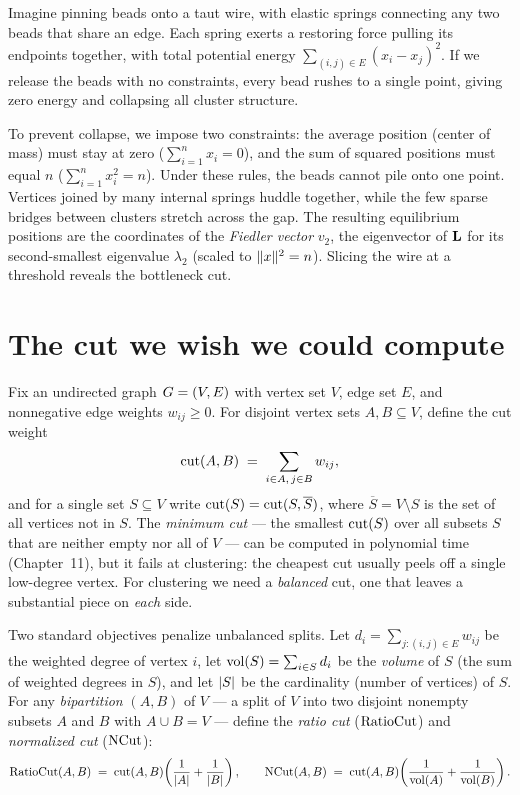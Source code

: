 \begin{intuitionbox}
Imagine pinning beads onto a taut wire, with elastic springs connecting any two beads that share an edge.
Each spring exerts a restoring force pulling its endpoints together, with total potential energy
$\sum_{(i,j)\in E}(x_i - x_j)^2$. If we release the beads with no constraints, every bead rushes to a single point, giving zero energy and collapsing all cluster structure.

To prevent collapse, we impose two constraints: the average position (center of mass) must stay at zero ($\sum_{i=1}^n x_i = 0$), and the sum of squared positions must equal $n$ ($\sum_{i=1}^n x_i^2 = n$). Under these
rules, the beads cannot pile onto one point. Vertices joined by many internal springs
huddle together, while the few sparse bridges between clusters stretch across the gap.
The resulting equilibrium positions are the coordinates of the \emph{Fiedler vector} $v_2$,
the eigenvector of $\mathbf{L}$ for its second-smallest eigenvalue $\lambda_2$ (scaled to $\lVert x\rVert^2 = n$). Slicing the wire
at a threshold reveals the bottleneck cut.
\end{intuitionbox}

\section{The cut we wish we could compute}
\label{ch33:the-cut}

Fix an undirected graph $G=(V,E)$ with vertex set $V$, edge set $E$, and nonnegative edge weights $w_{ij}\ge 0$. For disjoint vertex sets
$A,B\subseteq V$, define the cut weight
\[
  \operatorname{cut}(A,B) \;=\; \sum_{i\in A,\,j\in B} w_{ij},
\]
and for a single set $S \subseteq V$ write $\operatorname{cut}(S)=\operatorname{cut}(S,\overline S)$, where $\overline S = V\setminus S$ is the set of all vertices not in $S$. The
\emph{minimum cut} --- the smallest $\operatorname{cut}(S)$ over all subsets $S$ that are neither empty nor all of $V$ --- can be computed in polynomial time
(Chapter~11), but it fails at clustering: the cheapest cut usually peels off a single low-degree
vertex. For clustering we need a \emph{balanced} cut, one that leaves a substantial piece on \emph{each} side.

Two standard objectives penalize unbalanced splits. Let $d_i = \sum_{j:(i,j)\in E} w_{ij}$ be the weighted degree of vertex $i$, let $\operatorname{vol}(S)=\sum_{i\in S}d_i$ be the \emph{volume} of $S$ (the sum of weighted
degrees in $S$), and let $\lvert S\rvert$ be the cardinality (number of vertices) of $S$. For any \emph{bipartition} $(A,B)$ of $V$ --- a split of $V$ into two disjoint nonempty subsets $A$ and $B$ with $A \cup B = V$ --- define the \emph{ratio cut} ($\operatorname{RatioCut}$) and \emph{normalized cut} ($\operatorname{NCut}$):
\[
  \operatorname{RatioCut}(A,B) \;=\; \operatorname{cut}(A,B)\!\left(\frac{1}{\lvert A\rvert}+\frac{1}{\lvert B\rvert}\right),
  \qquad
  \operatorname{NCut}(A,B) \;=\; \operatorname{cut}(A,B)\!\left(\frac{1}{\operatorname{vol}(A)}+\frac{1}{\operatorname{vol}(B)}\right).
\]

